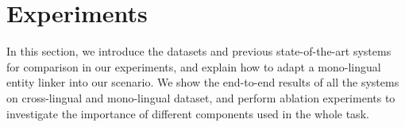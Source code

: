 \section{Experiments}
\label{sec:eval}



In this section, we introduce the datasets and previous state-of-the-art systems
for comparison in our experiments,
and explain how to adapt a mono-lingual entity linker into our scenario.
We show the end-to-end results of all the systems on cross-lingual and mono-lingual dataset, 
and perform ablation experiments to investigate the importance of different components used in the whole task.











